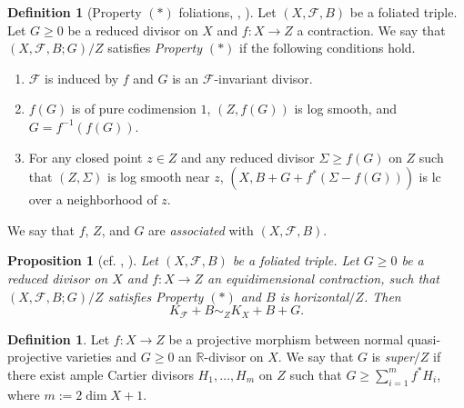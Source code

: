 \documentclass[11pt]{amsart}
\numberwithin{equation}{section}
\newcommand{\Rr}{\mathbb{R}}
\newcommand{\Ff}{\mathcal{F}}
\newtheorem{prop}[thm]{Proposition}
\theoremstyle{definition}
\newtheorem{defn}[thm]{Definition}
\theoremstyle{definition}
\theoremstyle{definition}
\begin{document}
\begin{defn}[Property $(*)$ foliations, {\cite[Definition 3.8]{ACSS21}, \cite[Definition 7.2.2]{CHLX23}}]\label{defn: foliation property *}
Let $(X,\Ff,B)$ be a foliated triple. Let $G\geq 0$ be a reduced divisor on $X$ and $f: X\rightarrow Z$ a contraction. We say that $(X,\Ff,B;G)/Z$ satisfies \emph{Property $(*)$} if the following conditions hold.
\begin{enumerate}
\item $\Ff$ is induced by $f$ and $G$ is an $\Ff$-invariant divisor.
\item $f(G)$ is of pure codimension $1$, $(Z,f(G))$ is log smooth, and $G=f^{-1}(f(G))$.
\item For any closed point $z\in Z$ and any reduced divisor  $\Sigma\ge f(G)$ on $Z$ such that  $(Z,\Sigma)$ is log smooth near $z$, $(X,B+G+f^*(\Sigma-f(G)))$ is lc over a neighborhood of $z$.
\end{enumerate}
We say that $f$, $Z$, and $G$ are \emph{associated} with $(X,\Ff,B)$.
\end{defn}

\begin{prop}[cf. {\cite[Proposition 3.6]{ACSS21}, \cite[Proposition 7.3.6]{CHLX23}}]\label{prop: weak cbf gfq}
Let $(X,\Ff,B)$ be a foliated triple. Let  $G\geq 0$ be a reduced divisor on $X$ and $f: X\rightarrow Z$ an equidimensional contraction, such that $(X,\Ff,B;G)/Z$ satisfies Property $(*)$ and $B$ is horizontal$/Z$. Then
$$K_{\Ff}+B\sim_{Z}K_X+B+G.$$
\end{prop}




\begin{defn}
Let $f: X\rightarrow Z$ be a projective morphism between normal quasi-projective varieties and $G\geq 0$ an $\Rr$-divisor on $X$. We say that $G$ is \emph{super$/Z$} if there exist ample Cartier divisors $H_1,\dots,H_{m}$ on $Z$ such that $G\geq\sum_{i=1}^{m}f^*H_i$, where $m:=2\dim X+1$.
\end{defn}
\end{document}
